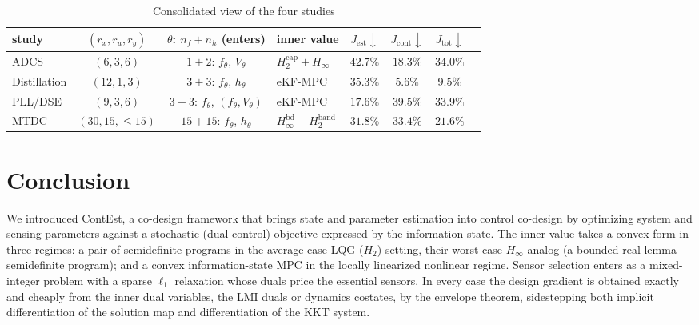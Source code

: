 \documentclass[twocolumn,amsthm]{autart}
\begin{document}
\begin{table}[t]
\centering
\caption{Consolidated view of the four studies}
\label{tab:formulations}
\begin{tabular}{lcclcccc}
\hline
study & $(r_x,r_u,r_y)$ & $\theta$: $n_f{+}n_h$ (enters) & inner value
& $J_{\mathrm{est}}\!\downarrow$ & $J_{\mathrm{cont}}\!\downarrow$ & $J_{\mathrm{tot}}\!\downarrow$\\
\hline
ADCS & $(6,3,6)$   & $1{+}2$: $f_\theta$, $V_\theta$ & $H_2^{\mathrm{cap}} + H_\infty$ & $42.7\%$ & $18.3\%$  & $\mathbf{34.0\%}$\\
Distillation      & $(12,1,3)$  & $3{+}3$: $f_\theta$, $h_\theta$ & eKF-MPC & $35.3\%$ & $5.6\%$  & $\mathbf{9.5\%}$\\
PLL/DSE    & $(9,3,6)$   & $3{+}3$: $f_\theta$, $(f_\theta,V_\theta)$ & eKF-MPC & $17.6\%$ & $39.5\%$ & $\mathbf{33.9\%}$\\
MTDC & $(30,15,\le\!15)$ & $15{+}15$: $f_\theta$, $h_\theta$ & $H_\infty^{\mathrm{bd}} + H_2^{\mathrm{band}}$ & $31.8\%$ & $33.4\%$ & $\mathbf{21.6\%}$\\
\hline
\end{tabular}
\end{table}

\section{Conclusion}\label{sec:conclusion}

We introduced ContEst, a co-design framework that brings state and parameter
estimation into control co-design by optimizing system and sensing parameters against a stochastic (dual-control) objective
expressed by the information state. The inner value takes a convex form in
three regimes: a pair of semidefinite programs in the average-case LQG ($H_2$)
setting, their worst-case $H_\infty$ analog (a bounded-real-lemma semidefinite program); and a convex information-state MPC
in the locally linearized nonlinear regime. Sensor selection enters as a
mixed-integer problem with a sparse $\ell_1$ relaxation whose duals price the
essential sensors. In every case the design gradient is obtained exactly and cheaply
from the inner dual variables, the LMI duals or dynamics costates, by the envelope
theorem, sidestepping both implicit differentiation of the solution map and
differentiation of the KKT system.
\end{document}
